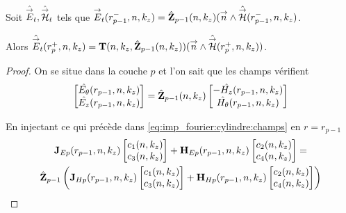     \begin{thm}
      Soit \(\hat{{\overset{\rightarrow}{E}}}_t,\hat{{\overset{\rightarrow}{\mathcal{H}}}}_t\) tels que \({\overset{\rightarrow}{E}}_t(r_{p-1}^-,n,k_z) = \hat{\mathbf{Z}}_{p-1}(n,k_z)({\overset{\rightarrow}{n}} \wedge \hat{{\overset{\rightarrow}{\mathcal{H}}}}(r_{p-1}^-,n,k_z)\).

      Alors \(\hat{{\overset{\rightarrow}{E}}}_t(r_p^+,n,k_z) = \mathbf{T}(n,k_z,\hat{\mathbf{Z}}_{p-1}(n,k_z))({\overset{\rightarrow}{n}} \wedge \hat{{\overset{\rightarrow}{\mathcal{H}}}}(r_p^+,n,k_z))\).
    \end{thm}


    \begin{proof}
      On se situe dans la couche \(p\) et l'on sait que les champs vérifient
      \begin{equation}
        \begin{bmatrix}
          \hat{E_\theta}(r_{p-1},n,k_z)\\
          \hat{E_z}(r_{p-1},n,k_z)\\
        \end{bmatrix}
        =
        \hat {\mathbf{Z}}_{p-1}(n,k_z)
        \begin{bmatrix}
          -\hat{H_z}(r_{p-1},n,k_z)\\
          \hat{H_\theta}(r_{p-1},n,k_z)\\
        \end{bmatrix}
      \end{equation}

      En injectant ce qui précède dans \eqref{eq:imp_fourier:cylindre:champs} en \(r = r_{p-1}\)
      \begin{multline}
        \mathbf{J}_{Ep}(r_{p-1},n,k_z)
        \begin{bmatrix}
          c_1(n,k_z) \\
          c_3(n,k_z)
        \end{bmatrix}
        +
        \mathbf{H}_{Ep}(r_{p-1},n,k_z)
        \begin{bmatrix}
          c_2(n,k_z) \\
          c_4(n,k_z)
        \end{bmatrix}
        =
        \\
        \hat {\mathbf{Z}}_{p-1}
        \left(
          \mathbf{J}_{Hp}(r_{p-1},n,k_z)
          \begin{bmatrix}
            c_1(n,k_z) \\
            c_3(n,k_z)
          \end{bmatrix}
          +
          \mathbf{H}_{Hp}(r_{p-1},n,k_z)
          \begin{bmatrix}
            c_2(n,k_z) \\
            c_4(n,k_z)
          \end{bmatrix}
        \right)
      \end{multline}


\end{proof}
